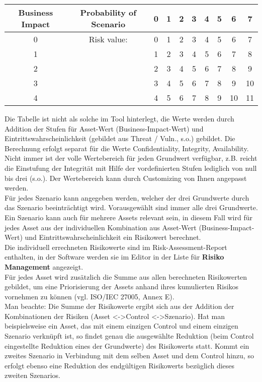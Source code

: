 \documentclass[a4paper,10pt]{book}
\begin{document}
\begin{longtable}{|c||c|c|c|c|c|c|c|c|c|}
\hline
Business Impact & Probability of Scenario & 0 & 1 & 2 & 3 & 4 & 5 & 6 & 7 \\[10pt] \hline\hline
0 & Risk value: & 0 & 1 & 2 & 3 & 4 & 5 & 6 & 7  \\[10pt] \hline
1 &  & 1 & 2 & 3 & 4 & 5 & 6 & 7 & 8  \\[10pt] \hline
2 &  & 2 & 3 & 4 & 5 & 6 & 7 & 8 & 9  \\[10pt] \hline
3 &  & 3 & 4 & 5 & 6 & 7 & 8 & 9 & 10  \\[10pt] \hline
4 &  & 4 & 5 & 6 & 7 & 8 & 9 & 10 & 11  \\[10pt] \hline
\end{longtable}
Die Tabelle ist nicht als solche im Tool hinterlegt, die Werte werden durch
Addition der Stufen für Asset-Wert (Business-Impact-Wert) und Eintrittswahrscheinlichkeit (gebildet aus Threat / Vuln., s.o.) gebildet.
Die Berechnung erfolgt separat für die Werte Confidentiality, Integrity, Availability. Nicht immer ist der volle Wertebereich für jeden Grundwert
verfügbar, z.B. reicht die Einstufung der Integrität mit Hilfe der vordefinierten Stufen lediglich von null bis drei (s.o.).
Der Wertebereich kann durch Customizing von Ihnen angepasst werden.
\newline\\
Für jedes Szenario kann
angegeben werden, welcher der drei Grundwerte durch das Szenario beeinträchtigt
wird. Vorausgewählt sind immer alle drei Grundwerte.
\newline\\
Ein Szenario kann auch für mehrere Assets relevant sein, in diesem Fall wird
für jedes Asset aus der individuellen Kombination aus Asset-Wert (Business-Impact-Wert) und
Eintrittswahrscheinlichkeit ein Risikowert berechnet.
\newline\\
Die individuell errechneten Risikowerte sind im Risk-Assessment-Report
enthalten, in der Software werden sie im Editor in der Liste für \textbf{Risiko Management} angezeigt.
\newline\\
Für jedes Asset wird zusätzlich die Summe aus allen berechneten Risikowerten
gebildet, um eine Priorisierung der Assets anhand ihres kumulierten Risikos
vornehmen zu können (vgl. ISO/IEC 27005, Annex E).
\newline\\
Man beachte: Die Summe der Risikowerte ergibt sich aus der Addition der Kombinationen der Risiken (Asset \textless-\textgreater Control \textless-\textgreater Szenario).
Hat man beispielsweise ein Asset, das mit einem einzigen Control und einem einzigen Szenario verknüpft ist, so findet genau die ausgewählte
Reduktion (beim Control eingestellte Reduktion eines der Grundwerte) des Risikowerts statt. Kommt ein zweites Szenario in Verbindung mit
dem selben Asset und dem Control hinzu, so erfolgt ebenso eine Reduktion des endgültigen Risikowerts bezüglich dieses zweiten Szenarios.
\end{document}
